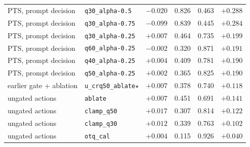 {\begin{longtable}{l|l|c|cc|c}
PTS, prompt decision & \texttt{q30\_alpha-0.5} & $-0.020$ & 0.826 & 0.463 & $+0.288$ \\
PTS, prompt decision & \texttt{q30\_alpha-0.75} & $-0.099$ & 0.839 & 0.445 & $+0.284$ \\
PTS, prompt decision & \texttt{q30\_alpha-0.25} & $+0.007$ & 0.464 & 0.735 & $+0.199$ \\
PTS, prompt decision & \texttt{q60\_alpha-0.25} & $-0.002$ & 0.320 & 0.871 & $+0.191$ \\
PTS, prompt decision & \texttt{q40\_alpha-0.25} & $+0.004$ & 0.409 & 0.781 & $+0.190$ \\
PTS, prompt decision & \texttt{q50\_alpha-0.25} & $+0.002$ & 0.365 & 0.825 & $+0.190$ \\
earlier gate + ablation & \texttt{u\_crq50\_ablate}$\star$ & $+0.007$ & 0.378 & 0.740 & $+0.118$ \\
ungated actions & \texttt{ablate} & $+0.007$ & 0.451 & 0.691 & $+0.141$ \\
ungated actions & \texttt{clamp\_q50} & $+0.017$ & 0.307 & 0.814 & $+0.122$ \\
ungated actions & \texttt{clamp\_q30} & $+0.012$ & 0.339 & 0.763 & $+0.102$ \\
ungated actions & \texttt{otq\_cal} & $+0.004$ & 0.115 & 0.926 & $+0.040$ \\
\hline
\end{longtable}}

